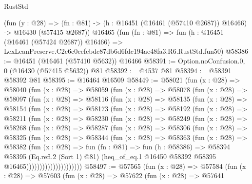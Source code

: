 \begin{lexlean}{RustStd}
\begin{coremodule}
    (fun (y : @28) =>
    (fn : @81) -> (h : @16451 (@16461 (@57410 @2687)) @16466) -> @16430 (@57415 @2687))
    @16465
    (fun (fn : @81) =>
    fun (h : @16451 (@16461 (@57424 @2687)) @16466) =>
    LexLeanPreserve.C2c6c0ccfcbdc87db6d6fdc194ae48fa3.R6.RustStd.fun50)
@58386 := @16451 (@16461 (@57410 @5632)) @16466
@58391 := Option.noConfusion.{0, 0} (@16430 (@57415 @5632)) @81
@58392 := @4537 @81
@58394 := @58391 @58392 @81
@58395 := @16464 @16509
@58449 := @58021
    (fun (x : @28) =>
    @58040
      (fun (x : @28) =>
      @58059
        (fun (x : @28) =>
        @58078
          (fun (x : @28) =>
          @58097
            (fun (x : @28) =>
            @58116
              (fun (x : @28) =>
              @58135
                (fun (x : @28) =>
                @58154
                  (fun (x : @28) =>
                  @58173
                    (fun (x : @28) =>
                    @58192
                      (fun (x : @28) =>
                      @58211
                        (fun (x : @28) =>
                        @58230
                          (fun (x : @28) =>
                          @58249
                            (fun (x : @28) =>
                            @58268
                              (fun (x : @28) =>
                              @58287
                                (fun (x : @28) =>
                                @58306
                                  (fun (x : @28) =>
                                  @58325
                                    (fun (x : @28) =>
                                    @58344
                                      (fun (x : @28) =>
                                      @58363
                                        (fun (x : @28) =>
                                        @58382
                                          (fun (x : @28) =>
                                          fun (fn : @81) =>
                                          fun (h : @58386) =>
                                          @58394
                                            @58395
                                            (Eq.refl.{2} (Sort 1) @81)
                                            (heq_of_eq.{1}
                                              @16450
                                              @58392
                                              @58395
                                              @16465)))))))))))))))))))))
@58497 := @57565
    (fun (x : @28) =>
    @57584
      (fun (x : @28) =>
      @57603
        (fun (x : @28) =>
        @57622
          (fun (x : @28) =>
          @57641

\end{coremodule}
\end{lexlean}
